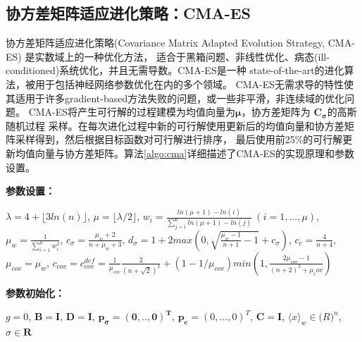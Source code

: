 \subsection{协方差矩阵适应进化策略：CMA-ES}

协方差矩阵适应进化策略(Covariance Matrix Adapted Evolution Strategy, CMA-ES) 是实数域上的一种优化方法，
适合于黑箱问题、非线性优化、病态(ill-conditioned)系统优化，并且无需导数\cite{cmapaper}。CMA-ES是一种
state-of-the-art的进化算法，被用于包括神经网络参数优化\cite{nn2016cma}在内的多个领域。
CMA-ES无需求导的特性使其适用于许多gradient-based方法失败的问题，或一些非平滑，非连续域的优化问题。
CMA-ES将产生可行解的过程建模为均值向量为$\mathbf{\mu}$，协方差矩阵为 $\mathbf{C_{\sigma}}$的高斯随机过程
采样。在每次进化过程中新的可行解使用更新后的均值向量和协方差矩阵采样得到，然后根据目标函数对可行解进行排序，
最后使用前25\%的可行解更新均值向量与协方差矩阵。算法\ref{algo:cma}详细描述了CMA-ES的实现原理和参数设置。

{\bf 参数设置：}

$\lambda = 4 + \lfloor 3 ln(n) \rfloor$, $\mu = \lfloor \lambda / 2\rfloor$,
$w_i = \frac{ln(\mu+1) - ln(i) }{\sum_{j=1}^{\mu}ln(\mu+1)-ln(j) } \ (i=1,...,\mu) $, 
$\mu_w = \frac{1}{\sum_{i=1}^{\mu} w_i^2}$, 
$c_\sigma = \frac{\mu_w + 2}{n + \mu_w + 3}$,
$d_\sigma =  1 + 2 max (0, \sqrt{\frac{\mu_w-1}{n+1}-1} + c_\sigma)$,
$c_c = \frac{4}{n+4}$, $\mu_{cov} = \mu_w$, 
$c_{cov} = c_{cov}^{def} = \frac{1}{\mu_{cov}} \frac{2}{(n+\sqrt{2})^2} + (1 - 1/\mu_{cov}) min (1, \frac{2\mu_{cov}-1}{(n+2)^2+\mu_cov})$


{\bf 参数初始化：}

$g=0$, $\mathbf{B=I}$, $\mathbf{D=I}$, $\mathbf{p_\sigma=(0,..,0)^T}$,
$\mathbf{p_c} = (0,...,0)^T$, $\mathbf{C=I}$, $\langle x \rangle_w \in \mathbb(R)^n$,
$\sigma \in \mathbf{R}$


